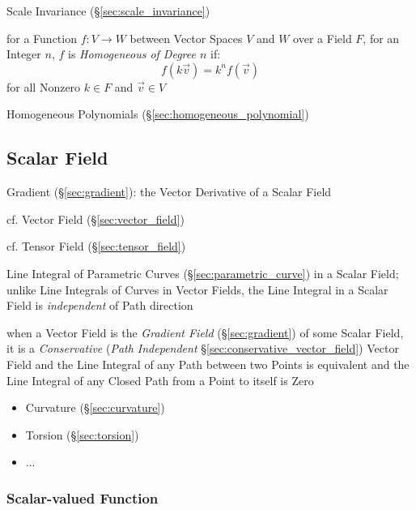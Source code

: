 Scale Invariance (\S\ref{sec:scale_invariance})

for a Function $f : V \rightarrow W$ between Vector Spaces $V$ and $W$ over a
Field $F$, for an Integer $n$, $f$ is \emph{Homogeneous of Degree $n$} if:
\[
  f(k{\vec{v}}) = k^n f(\vec{v})
\]
for all Nonzero $k \in F$ and $\vec{v} \in V$

Homogeneous Polynomials (\S\ref{sec:homogeneous_polynomial})



\subsection{Scalar Field}\label{sec:scalar_field}


Gradient (\S\ref{sec:gradient}): the Vector Derivative of a Scalar Field

cf. Vector Field (\S\ref{sec:vector_field})

cf. Tensor Field (\S\ref{sec:tensor_field})

Line Integral of Parametric Curves (\S\ref{sec:parametric_curve}) in a Scalar
Field; unlike Line Integrals of Curves in Vector Fields, the Line Integral in a
Scalar Field is \emph{independent} of Path direction

when a Vector Field is the \emph{Gradient Field} (\S\ref{sec:gradient}) of some
Scalar Field, it is a \emph{Conservative} (\emph{Path Independent}
\S\ref{sec:conservative_vector_field}) Vector Field and the Line Integral of
any Path between two Points is equivalent and the Line Integral of any Closed
Path from a Point to itself is Zero

\begin{itemize}
  \item Curvature (\S\ref{sec:curvature})
  \item Torsion (\S\ref{sec:torsion})
  \item ...
\end{itemize}



\subsubsection{Scalar-valued Function}\label{sec:scalar_function}

